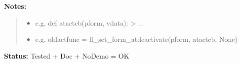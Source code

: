 \begin{boxedminipage}{\funcwidth}
\textbf{Notes:}
\begin{quote}
  \begin{itemize}

  \item
    \setlength{\parskip}{0.6ex}

e.g. def atactcb(pform, vdata): > ...


  \item 
e.g. oldactfunc = fl\_set\_form\_atdeactivate(pform, atactcb, None)


\end{itemize}

\end{quote}

\textbf{Status:} 
Tested + Doc + NoDemo = OK


    \end{boxedminipage}

    \label{xformslib:flbasic:fl_set_form_atdeactivate}

    \vspace{0.5ex}

